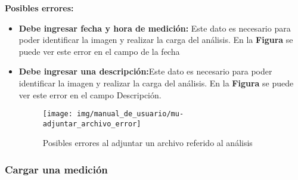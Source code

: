 	\textbf{Posibles errores:}
 	\begin{itemize}
 		\item \textbf{Debe ingresar fecha y hora de medición:} Este dato es necesario para poder identificar la imagen y realizar la carga del análisis. En la \textbf{Figura} se puede ver este error en el campo de la fecha
 		\item \textbf{Debe ingresar una descripción:}Este dato es necesario para poder identificar la imagen y realizar la carga del análisis. En la \textbf{Figura} se puede ver este error en el campo Descripción.
 		
 		\begin{figure}
 			\centering
 			\texttt{[image: img/manual\_de\_usuario/mu-adjuntar\_archivo\_error]}
 			\caption{Posibles errores al adjuntar un archivo referido al análisis}
 			\label{mu-adjuntar_archivo_error}	
 		\end{figure}
 		
 		
 	\end{itemize}
 	
 	
 		
 	\subsubsection{Cargar una medición} 
 	
